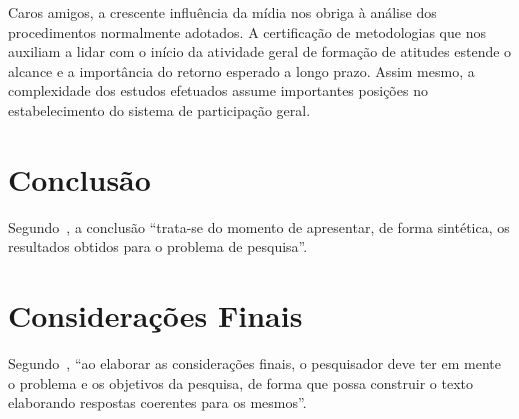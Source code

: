 \documentclass[font=plain,chapter=TITLE,section=Title,espaco=duplo,tocpage=plain,appendix=Name,floatnumber=continuous]{abnt}
\begin{document}
Caros amigos, a crescente influência da mídia nos obriga à análise dos
procedimentos normalmente adotados. A certificação de metodologias que nos
auxiliam a lidar com o início da atividade geral de formação de atitudes
estende o alcance e a importância do retorno esperado a longo prazo. Assim
mesmo, a complexidade dos estudos efetuados assume importantes posições no
estabelecimento do sistema de participação geral.

\chapter{Conclusão}

Segundo~\cite{normasUTP}, a conclusão “trata-se do momento de apresentar,
de forma sintética, os resultados obtidos para o problema de pesquisa”.

\chapter{Considerações Finais}

Segundo~\cite{normasUTP}, “ao elaborar as considerações finais, o
pesquisador deve ter em mente o problema e os objetivos da pesquisa, de
forma que possa construir o texto elaborando respostas coerentes para os
mesmos”.

%
%

\end{document}
